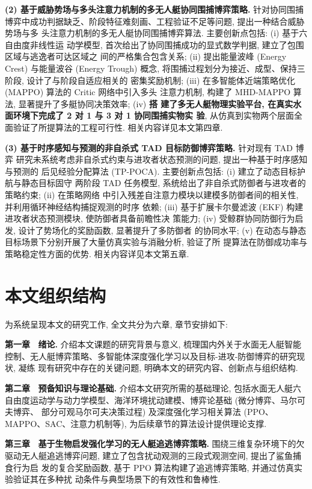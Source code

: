 \textbf{(2) 基于威胁势场与多头注意力机制的多无人艇协同围捕博弈策略.} 针对协同围捕
博弈中成功判据缺乏、阶段特征难刻画、工程验证不足等问题, 提出一种结合威胁势场与多
头注意力机制的多无人艇协同围捕博弈算法. 主要创新点包括: (i) 基于六自由度非线性运
动学模型, 首次给出了协同围捕成功的显式数学判据, 建立了包围区域与逃逸者可达区域之
间的严格集合包含关系; (ii) 提出能量波峰 (Energy Crest) 与能量波谷 (Energy
Trough) 概念, 将围捕过程划分为接近、成型、保持三阶段, 设计了与阶段自适应相关的
密集奖励机制; (iii) 在多智能体近端策略优化 (MAPPO) 算法的 Critic 网络中引入多头
注意力机制, 构建了 MHD-MAPPO 算法, 显著提升了多艇协同决策效率; (iv) \textbf{搭
建了多无人艇物理实验平台, 在真实水面环境下完成了 2 对 1 与 3 对 1 协同围捕实物实
验}, 从仿真到实物两个层面全面验证了所提算法的工程可行性. 相关内容详见本文第四章.

\textbf{(3) 基于时序感知与预测的非自杀式 TAD 目标防御博弈策略.} 针对现有 TAD 博弈
研究未系统考虑非自杀式约束与进攻者状态预测的问题, 提出一种基于时序感知与预测的
后见经验分配算法 (TP-POCA). 主要创新点包括: (i) 建立了动态目标护航与静态目标固守
两阶段 TAD 任务模型, 系统给出了非自杀式防御者与进攻者的策略约束; (ii) 在策略网络
中引入残差自注意力模块以建模多防御者间的相关性, 并利用循环神经结构捕捉观测的时序
依赖; (iii) 基于扩展卡尔曼滤波 (EKF) 构建进攻者状态预测模块, 使防御者具备前瞻性决
策能力; (iv) 受鲸群协同防御行为启发, 设计了势场化的奖励函数, 显著提升了多防御者
的协同水平; (v) 在动态与静态目标场景下分别开展了大量仿真实验与消融分析, 验证了所
提算法在防御成功率与策略稳定性方面的优势. 相关内容详见本文第五章.

\section{本文组织结构}
\label{sec:organization}
为系统呈现本文的研究工作, 全文共分为六章, 章节安排如下:

\textbf{第一章 \ 绪论.} 介绍本文课题的研究背景与意义, 梳理国内外关于水面无人艇智能
控制、无人艇博弈策略、多智能体深度强化学习以及目标-进攻-防御博弈的研究现状, 凝练
现有研究中存在的关键问题, 明确本文的研究内容、创新点与组织结构.

\textbf{第二章 \ 预备知识与理论基础.} 介绍本文研究所需的基础理论, 包括水面无人艇六
自由度运动学与动力学模型、海洋环境扰动建模、博弈论基础 (微分博弈、马尔可夫博弈、
部分可观马尔可夫决策过程) 及深度强化学习相关算法 (PPO、MAPPO、SAC、注意力机制等),
为后续章节的算法设计提供理论支撑.

\textbf{第三章 \ 基于生物启发强化学习的无人艇追逃博弈策略.} 围绕三维复杂环境下的欠
驱动无人艇追逃博弈问题, 建立了包含扰动观测的三段式观测空间, 提出了鲨鱼捕食行为启
发的复合奖励函数, 基于 PPO 算法构建了追逃博弈策略, 并通过仿真实验验证其在多种扰
动条件与典型场景下的有效性和鲁棒性.

